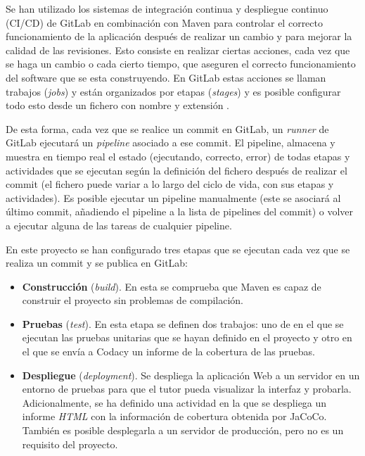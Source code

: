 Se han utilizado los sistemas de integración continua y despliegue continuo (CI/CD) de GitLab en combinación con Maven para controlar el correcto funcionamiento de la aplicación después de realizar un cambio y para mejorar la calidad de las revisiones. Esto consiste en realizar ciertas acciones, cada vez que se haga un cambio o cada cierto tiempo, que aseguren el correcto funcionamiento del software que se esta construyendo. En GitLab estas acciones se llaman trabajos (\textit{jobs}) y están organizados por etapas (\textit{stages}) y es posible configurar todo esto desde un fichero con nombre y extensión . 

De esta forma, cada vez que se realice un commit en GitLab, un \textit{runner} de GitLab ejecutará un \textit{pipeline} asociado a ese commit. El pipeline, almacena y muestra en tiempo real el estado (ejecutando, correcto, error) de todas etapas y actividades que se ejecutan según la definición del fichero  después de realizar el commit (el fichero puede variar a lo largo del ciclo de vida, con sus etapas y actividades). Es posible ejecutar un pipeline manualmente (este se asociará al último commit, añadiendo el pipeline a la lista de pipelines del commit) o volver a ejecutar alguna de las tareas de cualquier pipeline.

En este proyecto se han configurado tres etapas que se ejecutan cada vez que se realiza un commit y se publica en GitLab:
\begin{itemize}
	\item \textbf{Construcción} (\textit{build}). En esta se comprueba que Maven es capaz de construir el proyecto sin problemas de compilación.
	\item \textbf{Pruebas} (\textit{test}). En esta etapa se definen dos trabajos: uno de en el que se ejecutan las pruebas unitarias que se hayan definido en el proyecto y otro en el que se envía a Codacy un informe de la cobertura de las pruebas.
	\item \textbf{Despliegue} (\textit{deployment}). Se despliega la aplicación Web a un servidor en un entorno de pruebas para que el tutor pueda visualizar la interfaz y probarla. Adicionalmente, se ha definido una actividad en la que se despliega un informe \textit{HTML} con la información de cobertura obtenida por JaCoCo. También es posible desplegarla a un servidor de producción, pero no es un requisito del proyecto.
\end{itemize}

